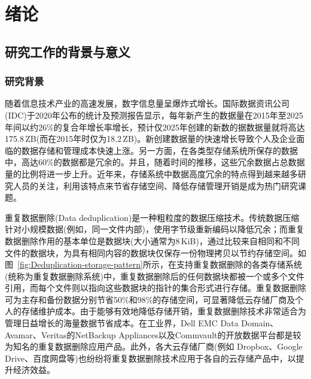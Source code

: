 \chapter{绪\hspace{6pt}论}
\label{chapter:introduction}

\section{研究工作的背景与意义}
\label{sec:intro}
\subsection{研究背景}
\label{subsec:intro-background}

随着信息技术产业的高速发展，数字信息量呈爆炸式增长。国际数据资讯公司(IDC)\cite{IDC}于2020年公布的统计及预测报告\cite{DataReport2020}显示，每年新产生的数据量在2015年至2025年间以约26\%的复合年增长率增长，预计仅2025年创建的新数的据数据量就将高达175.8\,ZB(而在2015年时仅为18.2\,ZB)。新创建数据量的快速增长导致个人及企业面临的数据存储和管理成本快速上涨\cite{敖莉2010重复数据删除技术}。另一方面，在各类型存储系统所保存的数据中，高达60\%的数据都是冗余的。并且，随着时间的推移，这些冗余数据占总数据量的比例将进一步上升\cite{mcknight2006digital}。近年来，存储系统中数据高度冗余的特点得到越来越多研究人员的关注，利用该特点来节省存储空间、降低存储管理开销是成为热门研究课题。

重复数据删除(Data deduplication)\cite{付印金2012重复数据删除关键技术研究进展, 敖莉2010重复数据删除技术,xia2016Deduplication,Paulo2014}是一种粗粒度的数据压缩技术。传统数据压缩针对小规模数据(例如，同一文件内部)，使用字节级重新编码以降低冗余；而重复数据删除作用的基本单位是数据块(大小通常为8\,KiB)，通过比较来自相同和不同文件的数据块，为具有相同内容的数据块仅保存一份物理拷贝以节约存储空间。如图~\ref{fig:Deduplication-storage-pattern}所示，在支持重复数据删除的各类存储系统(统称为重复数据删除系统)中，重复数据删除后的任何数据块都被一个或多个文件引用，而每个文件则以指向这些数据块的指针的集合形式进行存储。重复数据删除可为主存和备份数据分别节省50\%\cite{meyer2011deduplication}和98\%\cite{wallace12}的存储空间，可显著降低云存储厂商及个人的存储维护成本\cite{付印金2012重复数据删除关键技术研究进展}。由于能够有效地降低存储开销，重复数据删除技术非常适合为管理日益增长的海量数据节省成本。在工业界，Dell EMC Data Domain\cite{EMCDataDomain}、Avamar\cite{Avamar}、Veritas的NetBackup Appliances\cite{veritas}以及Commvault的开放数据平台\cite{CommVault}都是较为知名的重复数据删除应用产品。此外，各大云存储厂商(例如 Dropbox\cite{Dropbox}、Google Drive\cite{GoogleDrive}、百度网盘\cite{BaiduPan}等)也纷纷将重复数据删除技术应用于各自的云存储产品中，以提升经济效益\cite{harnik2010side}。


